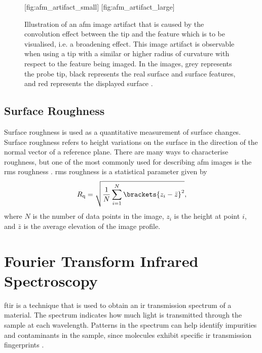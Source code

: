 \begin{figure}[htbp]
    \centering
    [fig:afm_artifact_small]
    \hfill
    [fig:afm_artifact_large]
    \caption[Illustration of the convolution effect in an \ac{afm} image due to tip size.]{Illustration of an \ac{afm} image artifact that is caused by the convolution effect between the tip and the feature which is to be visualised, i.e. a broadening effect. This image artifact is observable when using a tip with  a similar or  higher radius of curvature with respect to the feature being imaged. In the images, grey represents the probe tip, black represents the real surface and surface features, and red represents the displayed surface \citep[Adapted from][]{psia2002xe100}.}
    \label{fig:afm_tip-convolution}
\end{figure}

\subsection{Surface Roughness}

Surface roughness is used as a quantitative measurement of surface changes. Surface roughness refers to height variations on the surface in the direction of the normal vector of a reference plane. There are many ways to characterise roughness, but one of the most commonly used for describing \ac{afm} images is the \ac{rms} roughness \citep{eaton2010atomic}. \Ac{rms} roughness is a statistical parameter given by \citep{thomas1999amplitude}
\begin{equation}
R_\textrm{q} = \sqrt{\frac{1}{N}\sum_{i=1}^{N}\brackets{z_i-\bar{z}}^2},
\end{equation}
where $N$ is the number of data points in the image, $z_i$ is the height at point $i$, and $\bar{z}$ is the average elevation of the image profile. %

\section{Fourier Transform Infrared Spectroscopy}\label{sec:ftir}
\Acf{ftir} is a technique that is used to obtain an \ac{ir} transmission spectrum of a material. The spectrum indicates how much light is transmitted through the sample at each wavelength. Patterns in the spectrum can help identify impurities and contaminants in the sample, since molecules exhibit specific \ac{ir} transmission fingerprints \citep{smith2011fourier}.

